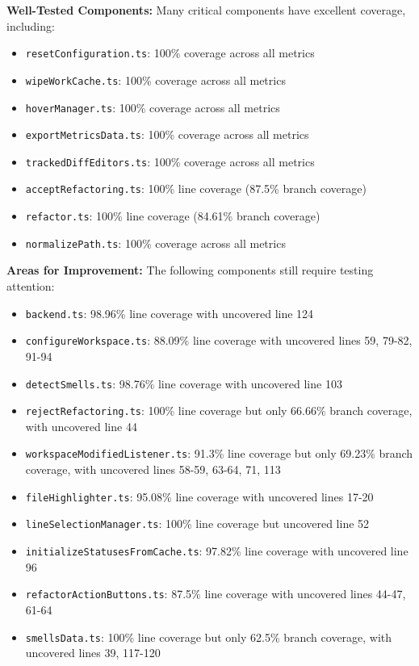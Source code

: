 \documentclass[12pt, titlepage]{article}
\begin{document}
\noindent \textbf{Well-Tested Components:} Many critical components have excellent coverage, including:
\begin{itemize}
  \item \texttt{resetConfiguration.ts}: 100\% coverage across all metrics
  \item \texttt{wipeWorkCache.ts}: 100\% coverage across all metrics
  \item \texttt{hoverManager.ts}: 100\% coverage across all metrics
  \item \texttt{exportMetricsData.ts}: 100\% coverage across all metrics
  \item \texttt{trackedDiffEditors.ts}: 100\% coverage across all metrics
  \item \texttt{acceptRefactoring.ts}: 100\% line coverage (87.5\% branch coverage)
  \item \texttt{refactor.ts}: 100\% line coverage (84.61\% branch coverage)
  \item \texttt{normalizePath.ts}: 100\% coverage across all metrics
\end{itemize}

\noindent \textbf{Areas for Improvement:} The following components still require testing attention:
\begin{itemize}
  \item \texttt{backend.ts}: 98.96\% line coverage with uncovered line 124
  \item \texttt{configureWorkspace.ts}: 88.09\% line coverage with uncovered lines 59, 79-82, 91-94
  \item \texttt{detectSmells.ts}: 98.76\% line coverage with uncovered line 103
  \item \texttt{rejectRefactoring.ts}: 100\% line coverage but only 66.66\% branch coverage, with uncovered line 44
  \item \texttt{workspaceModifiedListener.ts}: 91.3\% line coverage but only 69.23\% branch coverage, with uncovered lines 58-59, 63-64, 71, 113
  \item \texttt{fileHighlighter.ts}: 95.08\% line coverage with uncovered lines 17-20
  \item \texttt{lineSelectionManager.ts}: 100\% line coverage but uncovered line 52
  \item \texttt{initializeStatusesFromCache.ts}: 97.82\% line coverage with uncovered line 96
  \item \texttt{refactorActionButtons.ts}: 87.5\% line coverage with uncovered lines 44-47, 61-64
  \item \texttt{smellsData.ts}: 100\% line coverage but only 62.5\% branch coverage, with uncovered lines 39, 117-120
\end{itemize}
\end{document}
